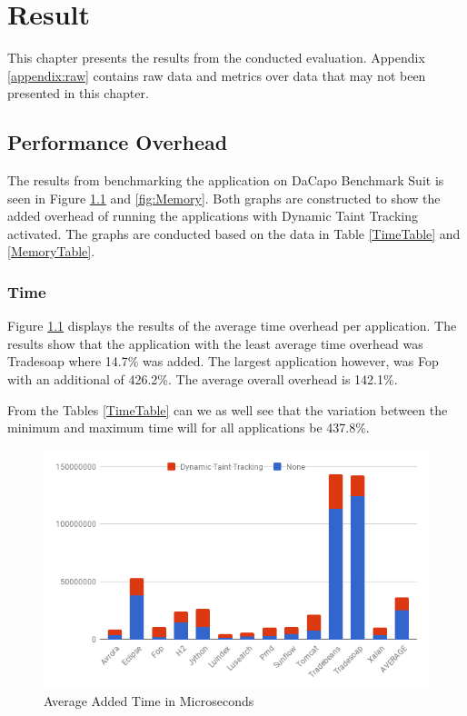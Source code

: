 \chapter{Result}
This chapter presents the results from the conducted evaluation. Appendix \ref{appendix:raw} contains raw data and metrics over data that may not been presented in this chapter.


\section{Performance Overhead}
The results from benchmarking the application on DaCapo Benchmark Suit \parencite{dacapo} is seen in Figure \ref{fig:Time} and \ref{fig:Memory}. Both graphs are constructed to show the added overhead of running the applications with Dynamic Taint Tracking activated. The graphs are conducted based on the data in Table \ref{TimeTable} and \ref{MemoryTable}.


\subsection{Time}
Figure \ref{fig:Time} displays the results of the average time overhead per application. The results show that the application with the least average time overhead was Tradesoap where 14.7\% was added. The largest application however, was Fop with an additional of 426.2\%. The average overall overhead is 142.1\%.

From the Tables \ref{TimeTable} can we as well see that the variation between the minimum and maximum time will for all applications be 437.8\%.

\begin{figure}[H]
	\centering
	\includegraphics[width=\textwidth]{images/Time.png}
	\caption{Average Added Time in Microseconds}
	\label{fig:Time}
\end{figure}


